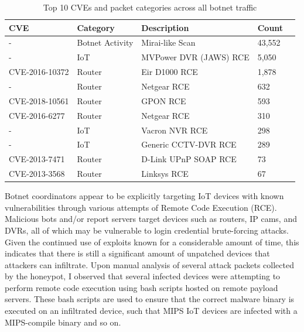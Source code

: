 \begin{table}[!htb]
    \caption{Top 10 CVEs and packet categories across all botnet traffic}
    \centering
    \label{tab:cve_categories}
    \begin{tabular}{|l|l|l|l|l|}
    \hline
    \textbf{CVE} & \textbf{Category} & \textbf{Description} & \textbf{Count} \\ \hline
    -               & Botnet Activity & Mirai-like Scan & 43,552 \\ \hline
    -               & IoT             & MVPower DVR (JAWS) RCE & 5,050 \\ \hline
    CVE-2016-10372  & Router          & Eir D1000 RCE & 1,878 \\ \hline
    -               & Router          & Netgear RCE & 632 \\ \hline
    CVE-2018-10561  & Router          & GPON RCE & 593 \\ \hline
    CVE-2016-6277   & Router          & Netgear RCE & 310 \\ \hline
    -               & IoT             & Vacron NVR RCE & 298 \\ \hline
    -               & IoT             & Generic CCTV-DVR RCE & 289 \\ \hline
    CVE-2013-7471   & Router          & D-Link UPnP SOAP RCE & 73 \\ \hline
    CVE-2013-3568   & Router          & Linksys RCE & 67 \\ \hline
    \end{tabular}
\end{table}

Botnet coordinators appear to be explicitly targeting IoT devices with known vulnerabilities through various attempts of Remote Code Execution (RCE). Malicious bots and/or report servers target devices such as routers, IP cams, and DVRs, all of which may be vulnerable to login credential brute-forcing attacks. Given the continued use of exploits known for a considerable amount of time, this indicates that there is still a significant amount of unpatched devices that attackers can infiltrate. Upon manual analysis of several attack packets collected by the honeypot, I observed that several infected devices were attempting to perform remote code execution using bash scripts hosted on remote payload servers. These bash scripts are used to ensure that the correct malware binary is executed on an infiltrated device, such that MIPS IoT devices are infected with a MIPS-compile binary and so on.


